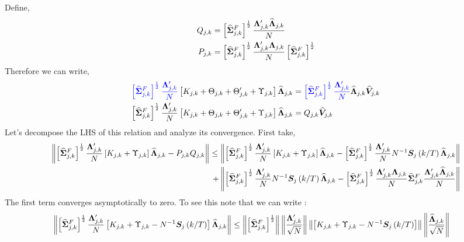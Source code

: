 \documentclass[main_document.tex]{subfiles}
\begin{document}
Define, 
\begin{align}
	Q_{j,k} &= \left[\widehat{\bm{\Sigma}}_{j,k}^{F}\right]^{\frac{1}{2}} \frac{\bm{\Lambda}_{j,k}'\widehat{\bm{\Lambda}}_{j,k}}{N} \label{eq:Q} \\
	P_{j,k} &= \left[\widehat{\bm{\Sigma}}_{j,k}^{F}\right]^{\frac{1}{2}} \frac{\bm{\Lambda}_{j,k}'\bm{\Lambda}_{j,k}}{N} \left[\widehat{\bm{\Sigma}}_{j,k}^{F}\right]^{\frac{1}{2}} \label{eq:P}
\end{align}
Therefore we can write, 
\begin{align}
	\textcolor{blue}{\left[\widehat{\bm{\Sigma}}_{j,k}^{F}\right]^{\frac{1}{2}} \frac{\bm{\Lambda}_{j,k}'}{N}} \left [ K_{j,k} + \Theta_{j,k} + \Theta_{j,k}' + \Upsilon_{j,k} \right] \widehat{\bm{\Lambda}}_{j,k} &= \textcolor{blue}{\left[\widehat{\bm{\Sigma}}_{j,k}^{F}\right]^{\frac{1}{2}} \frac{\bm{\Lambda}_{j,k}'}{N}} \widehat{\bm{\Lambda}}_{j,k} \widehat{\bm{V}}_{j,k} \nonumber \\
	\left[\widehat{\bm{\Sigma}}_{j,k}^{F}\right]^{\frac{1}{2}} \frac{\bm{\Lambda}_{j,k}'}{N} \left [ K_{j,k} + \Theta_{j,k} + \Theta_{j,k}' + \Upsilon_{j,k} \right] \widehat{\bm{\Lambda}}_{j,k}&= Q_{j,k}\widehat{\bm{V}}_{j,k} \label{eq:V_basicRelation}
\end{align}
Let's decompose the LHS of this relation and analyze its convergence. First take, 
\begin{align*}
	\left\lVert\left[\widehat{\bm{\Sigma}}_{j,k}^{F}\right]^{\frac{1}{2}} \frac{\bm{\Lambda}_{j,k}'}{N} \left [ K_{j,k} + \Upsilon_{j,k} \right] \widehat{\bm{\Lambda}}_{j,k} - P_{j,k}Q_{j,k}\right\rVert \leq \left\lVert\left[\widehat{\bm{\Sigma}}_{j,k}^{F}\right]^{\frac{1}{2}} \frac{\bm{\Lambda}_{j,k}'}{N} \left [ K_{j,k} + \Upsilon_{j,k} \right] \widehat{\bm{\Lambda}}_{j,k} - \left[\widehat{\bm{\Sigma}}_{j,k}^{F}\right]^{\frac{1}{2}} \frac{\bm{\Lambda}_{j,k}'}{N} N^{-1} \bm{S}_{j}\left(k/T\right) \widehat{\bm{\Lambda}}_{j,k}\right\rVert \\ + \left\lVert \left[\widehat{\bm{\Sigma}}_{j,k}^{F}\right]^{\frac{1}{2}} \frac{\bm{\Lambda}_{j,k}'}{N} N^{-1} \bm{S}_{j}\left(k/T\right) \widehat{\bm{\Lambda}}_{j,k} - \left[\widehat{\bm{\Sigma}}_{j,k}^{F}\right]^{\frac{1}{2}} \frac{\bm{\Lambda}_{j,k}'\bm{\Lambda}_{j,k}}{N}\widehat{\bm{\Sigma}}_{j,k}^{F}\frac{\bm{\Lambda}_{j,k}'\widehat{\bm{\Lambda}}_{j,k}}{N}\right\rVert
\end{align*} 
 The first term converges asymptotically to zero. To see this note that we can write :
\begin{align*}
	\left\lVert\left[\widehat{\bm{\Sigma}}_{j,k}^{F}\right]^{\frac{1}{2}} \frac{\bm{\Lambda}_{j,k}'}{N} \left [ K_{j,k} + \Upsilon_{j,k} - N^{-1}\bm{S}_{j}\left(k/T\right) \right] \widehat{\bm{\Lambda}}_{j,k}\right\rVert 
	& \leq \left\lVert\left[\widehat{\bm{\Sigma}}_{j,k}^{F}\right]^{\frac{1}{2}}\right\rVert \left\lVert\frac{\bm{\Lambda}_{j,k}'}{\sqrt{N}}\right\rVert \left\lVert\left [ K_{j,k} + \Upsilon_{j,k} - N^{-1}\bm{S}_{j}\left(k/T\right) \right]\right\rVert \left\lVert\frac{\widehat{\bm{\Lambda}}_{j,k}}{\sqrt{N}}\right\rVert
\end{align*}
\end{document}
